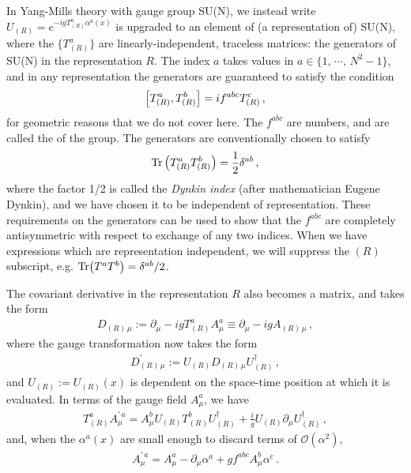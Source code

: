 In Yang-Mills theory with gauge group SU(N), we instead write \(U_{(R)} = e^{-i g T_{(R)}^a \alpha^a(x)}\) is upgraded to an element of (a representation of) SU(N), where the \(\{T^a_{(R)}\}\) are linearly-independent, traceless matrices:
%
the generators of SU(N) in the representation \(R\).
%
The index \(a\) takes values in \(a \in \{1,\,\cdots,\,N^2-1\}\), and in any representation the generators are guaranteed to satisfy the condition
\begin{align}
    \comm{T^a_{(R)}}{T^b_{(R)}}
    =
    i f^{abc} T^c_{(R)}
    \,,
\end{align}
for geometric reasons that we do not cover here.
%
The \(f^{abc}\) are numbers, and are called the  of the group.
%
The generators are conventionally chosen to satisfy
\begin{align}
    \Tr\left(T_{(R)}^a T_{(R)}^b\right) = \frac{1}{2} \delta^{ab}
    \,,
\end{align}
where the factor 1/2 is called the \textit{Dynkin index} (after mathematician Eugene Dynkin), and we have chosen it to be independent of representation.
%
These requirements on the generators can be used to show that the \(f^{abc}\) are completely antisymmetric with respect to exchange of any two indices.
%
When we have expressions which are representation independent, we will suppress the \((R)\) subscript, e.g. \(\Tr (T^a T^b) = \delta^{ab}/2\).


The covariant derivative in the representation \(R\) also becomes a matrix, and takes the form
\begin{align}
    D_{(R)\,\mu}
    :=
    \partial_\mu
    -
    i g T^a_{(R)} A^a_\mu
    \equiv
    \partial_\mu
    -
    i g A_{(R)\,\mu}
    \,,
\end{align}
where the gauge transformation now takes the form
\begin{align}
    D^\prime_{(R)\,\mu}
    :=
    U_{(R)}
    D_{(R)\,\mu}
    U^\dagger_{(R)}
    \,,
\end{align}
and \(U_{(R)} := U_{(R)}(x)\) is dependent on the space-time position at which it is evaluated.
%
In terms of the gauge field \(A^a_\mu\), we have
\begin{align}
    T^a_{(R)} A^{\prime\,a}_\mu
    =
    A_\mu^b
    U_{(R)} T^b_{(R)} U^\dagger_{(R)}
    +
    \frac{i}{g} U_{(R)} \partial_\mu U^\dagger_{(R)}
    \,,
\end{align}
and, when the \(\alpha^a(x)\) are small enough to discard terms of \(\mathcal{O}(\alpha^2)\),
\begin{align}
    A^{\prime\,a}_\mu
    =
    A^{a}_\mu
    -
    \partial_\mu \alpha^a
    +
    g f^{abc} A^b_\mu \alpha^c
    \,.
\end{align}

